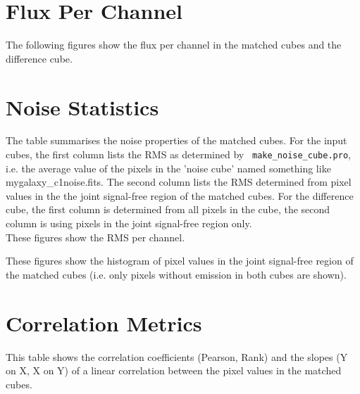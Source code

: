 \documentclass[11pt]{article}
\begin{document}
\section{Flux Per Channel}
\label{sect:perchannel}
%

\noindent The following figures show the flux per channel in the matched cubes and the difference cube.





%

\section{Noise Statistics}
\label{sec:noise_stats}

\noindent The table summarises the noise properties of the matched cubes. For the
input cubes, the first column lists the RMS as determined by {\tt
  make\_noise\_cube.pro}, i.e. the average value of the pixels in the
'noise cube' named something like mygalaxy\_c1noise.fits. The second
column lists the RMS determined from pixel values in the the joint
signal-free region of the matched cubes. For the difference cube, the
first column is determined from all pixels in the cube, the second
column is using pixels in the joint signal-free region only.\\



\noindent These figures show the RMS per channel.




\noindent These figures show the histogram of pixel values in the
joint signal-free region of the matched cubes (i.e. only pixels
without emission in both cubes are shown).





\section{Correlation Metrics}
\label{sec:correlation_stats}

\noindent This table shows the correlation coefficients (Pearson,
Rank) and the slopes (Y on X, X on Y) of a linear correlation between
the pixel values in the matched cubes.


\end{document}
